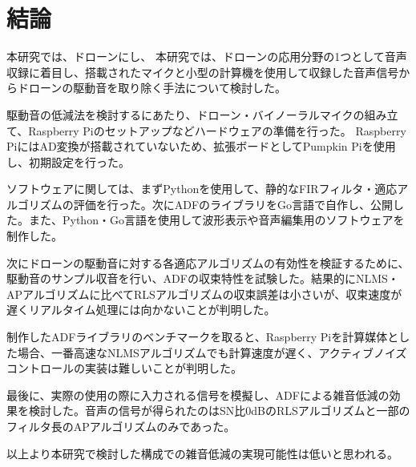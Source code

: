 \hypertarget{ux7d50ux8ad6}{%
\section{結論}\label{ux7d50ux8ad6}}

本研究では、ドローンにし、
本研究では、ドローンの応用分野の1つとして音声収録に着目し、搭載されたマイクと小型の計算機を使用して収録した音声信号からドローンの駆動音を取り除く手法について検討した。

駆動音の低減法を検討するにあたり、ドローン・バイノーラルマイクの組み立て、Raspberry
Piのセットアップなどハードウェアの準備を行った。 Raspberry
PiにはAD変換が搭載されていないため、拡張ボードとしてPumpkin
Piを使用し、初期設定を行った。

ソフトウェアに関しては、まずPythonを使用して、静的なFIRフィルタ・適応アルゴリズムの評価を行った。次にADFのライブラリをGo言語で自作し、公開した。また、Python・Go言語を使用して波形表示や音声編集用のソフトウェアを制作した。

次にドローンの駆動音に対する各適応アルゴリズムの有効性を検証するために、駆動音のサンプル収音を行い、ADFの収束特性を試験した。結果的にNLMS・APアルゴリズムに比べてRLSアルゴリズムの収束誤差は小さいが、収束速度が遅くリアルタイム処理には向かないことが判明した。

制作したADFライブラリのベンチマークを取ると、Raspberry
Piを計算媒体とした場合、一番高速なNLMSアルゴリズムでも計算速度が遅く、アクティブノイズコントロールの実装は難しいことが判明した。

最後に、実際の使用の際に入力される信号を模擬し、ADFによる雑音低減の効果を検討した。音声の信号が得られたのはSN比0dBのRLSアルゴリズムと一部のフィルタ長のAPアルゴリズムのみであった。

以上より本研究で検討した構成での雑音低減の実現可能性は低いと思われる。
